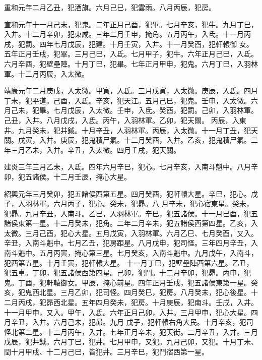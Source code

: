 \begin{pinyinscope}
 重和元年二月乙丑，犯酒旗。六月己巳，犯雲雨。八月丙辰，犯房。



 宣和元年十一月己未，犯鬼。二年正月己酉，犯畢。七月辛亥，犯牛。九月丁巳，入井。十二月辛卯，犯東咸。三年二月壬申，掩角。五月丙午，入氐。十一月丙戌，犯罰。四年七月戊辰，犯建。十月壬寅，入井。十一月癸酉，犯軒轅御
 女。五年正月壬戌，犯畢。三月己巳，入氐。七月甲子，犯牛。六年正月己巳，入氐。六月辛酉，犯壁壘陣。十月丁巳，犯畢。七年正月甲申，犯鬼。六月丁巳，入羽林軍。十二月丙辰，入太微。



 靖康元年二月庚戌，入太微。甲寅，入氐。三月戊寅，入太微。庚辰，入氐。四月丁未，犯平道。己酉，入氐。辛亥，犯天江。五月己巳，犯鬼。壬申，入太微。六月己未，犯畢。七月戊辰，入太微。壬申，入氐。癸酉，犯罰。己卯，入羽林軍。己丑，入井。八月戊戌，入氐。丙午，入羽林軍。乙卯，犯天關。
 丙辰，入東井。九月癸未，犯井鉞。十月辛丑，人羽林軍。丙辰，入太微。十一月丁丑，犯天關。戊寅，入井。庚辰，犯鬼積尸氣。十二月癸酉，入井。乙亥，犯鬼積尸氣。二年三月乙未，入井。辛丑，入太微。四月壬戌，犯天關。



 建炎三年三月乙未，入氐。四年六月辛巳，犯心。七月辛亥，入南斗魁中。八月辛卯，犯五諸侯。十二月壬辰，掩心大星。



 紹興元年三月癸卯，犯五諸侯西第五星。四月癸酉，犯軒轅大星。辛巳，犯心。戊子，入羽林軍。六月丙子，犯心。癸未，犯昴。八
 月辛未，犯心宿東星。癸未，犯昴。九月辛丑，入南斗。乙巳，入羽林軍。辛巳，犯五諸侯。十一月巳酉，犯五諸侯東第一星。十二月癸未，犯角。二年二月辛未，犯五諸侯西第四星。乙亥，入太微。三月己酉，犯心大星。五月戊寅，入羽林軍。六月乙巳、七月癸酉，又入。辛丑，入南斗魁中。七月乙丑，犯房距星。八月戊申，犯司怪。三年四月辛丑，入南斗魁中。五月丙寅，掩心第三星。七月癸亥，入南斗魁中。九月戊午，入南斗，犯西第五星。十月壬寅，犯軒轅大星。
 十一月丁巳，犯壁壘陣西第六星。乙丑，犯五車。丁卯，犯五諸侯西第四星。己卯，犯鬥。十二月辛卯，犯昴。丙申，犯鬼。丁酉，犯軒轅御女。甲辰，掩心前星。四年正月壬戌，犯五諸侯東第一星。癸亥，犯鬼西北星。三月乙卯，犯司怪。四月癸巳，犯房。八月癸未，犯心後星。十二月丙戌，犯昴西北星。五年四月癸未，犯房。十月庚辰，犯南斗。壬戌，入井。十一月甲申，又入。甲午，入氐。六年正月己卯，入井。三月甲申，犯心大星。四月辛丑，入井。六月己未，犯昴。九月
 戊子，犯軒轅右角大民。十月辛亥，犯司怪北第二星。十二月丙午，入井。七年正月辛未，犯天街。二月辛丑，入井。三月戊辰，犯井鉞。六月丁巳，犯井。七月甲申，又犯。九月己卯，又犯。十月丁未、閏十月甲戌、十二月己巳，皆犯井。三月辛巳，犯鬥宿西第一星。




\end{pinyinscope}
